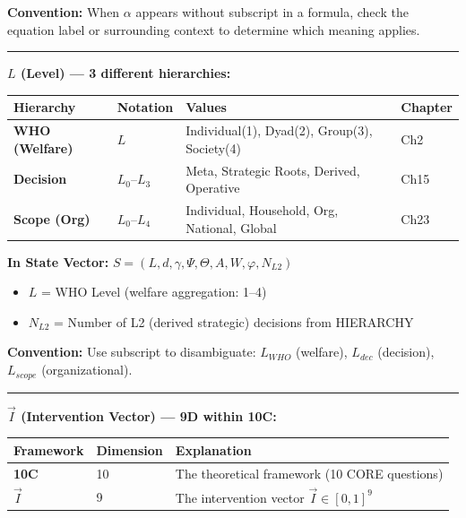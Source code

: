 \begin{tcolorbox}[colback=yellow!5!white, colframe=yellow!75!black,
    title=\textbf{IMPORTANT: Symbol Disambiguation}]
\textbf{Convention:} When $\alpha$ appears without subscript in a formula, check the equation label
or surrounding context to determine which meaning applies.

\vspace{0.5em}
\hrule
\vspace{0.5em}

\textbf{$L$ (Level) --- 3 different hierarchies:}

\begin{center}
\renewcommand{\arraystretch}{1.2}
\begin{tabular}{@{}llll@{}}
\toprule
\textbf{Hierarchy} & \textbf{Notation} & \textbf{Values} & \textbf{Chapter} \\
\midrule
\textbf{WHO (Welfare)} & $L$ & Individual(1), Dyad(2), Group(3), Society(4) & Ch2 \\
\textbf{Decision} & $L_0$--$L_3$ & Meta, Strategic Roots, Derived, Operative & Ch15 \\
\textbf{Scope (Org)} & $L_0$--$L_4$ & Individual, Household, Org, National, Global & Ch23 \\
\bottomrule
\end{tabular}
\end{center}

\textbf{In State Vector:} $S = (L, d, \gamma, \Psi, \Theta, A, W, \varphi, N_{L2})$
\begin{itemize}[nosep]
    \item $L$ = WHO Level (welfare aggregation: 1--4)
    \item $N_{L2}$ = Number of L2 (derived strategic) decisions from HIERARCHY
\end{itemize}

\textbf{Convention:} Use subscript to disambiguate: $L_{WHO}$ (welfare), $L_{dec}$ (decision), $L_{scope}$ (organizational).

\vspace{0.5em}
\hrule
\vspace{0.5em}

\textbf{$\vec{I}$ (Intervention Vector) --- 9D within 10C:}

\begin{center}
\renewcommand{\arraystretch}{1.2}
\begin{tabular}{@{}lll@{}}
\toprule
\textbf{Framework} & \textbf{Dimension} & \textbf{Explanation} \\
\midrule
\textbf{10C} & 10 & The theoretical framework (10 CORE questions) \\
\textbf{$\vec{I}$} & 9 & The intervention vector $\vec{I} \in [0,1]^9$ \\
\bottomrule
\end{tabular}
\end{center}


\end{tcolorbox}

